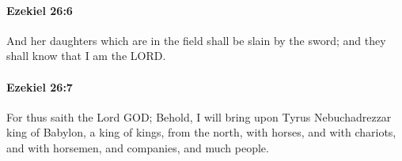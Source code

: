 		\paragraph{Ezekiel 26:6} %
			\label{EZEKIEL-26-6}

			And her daughters which are in the field shall be slain by the sword; and they shall know that I am the LORD.


		\paragraph{Ezekiel 26:7} %
			\label{EZEKIEL-26-7}

			For thus saith the Lord GOD; Behold, I will bring upon Tyrus Nebuchadrezzar king of Babylon, a king of kings, from the north, with horses, and with chariots, and with horsemen, and companies, and much people.


